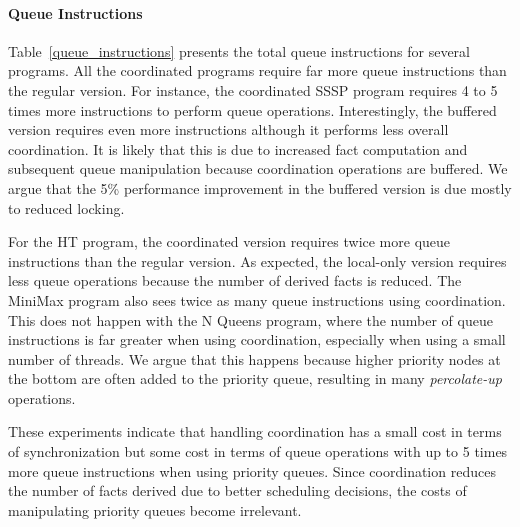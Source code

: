 \paragraph{Queue Instructions}

Table~\ref{queue_instructions} presents the total queue instructions for several
programs. All the coordinated programs require far more queue instructions than
the regular version. For instance, the coordinated SSSP program requires 4 to 5
times more instructions to perform queue operations. Interestingly, the buffered
version requires even more instructions although it performs less overall
coordination. It is likely that this is due to increased fact computation and
subsequent queue manipulation because coordination operations are buffered.
We argue that the 5\% performance improvement in the
buffered version is due mostly to reduced locking.

For the HT program, the coordinated version requires twice more queue
instructions than the regular version. As expected, the local-only version
requires less queue operations because the number of derived facts is reduced.
The MiniMax program also sees twice as many queue instructions using
coordination. This does not happen with the N Queens program, where the number
of queue instructions is far greater when using coordination, especially when
using a small number of threads. We argue that this happens because higher
priority nodes at the bottom are often added to the priority queue, resulting in
many \emph{percolate-up} operations.

These experiments indicate that handling coordination has a small cost in terms
of synchronization but some cost in terms of queue operations with
up to 5 times more queue instructions when using priority queues.
Since coordination reduces the number of facts derived due to better scheduling
decisions, the costs of manipulating priority queues become irrelevant.
\fi
